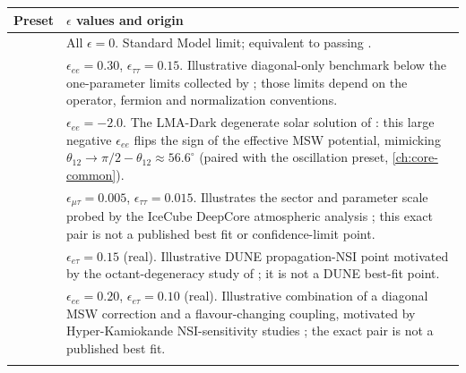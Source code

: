 \begin{implbox}
\begin{center}
\small
\begin{tabular}{@{}ll@{}}
\toprule
Preset & $\epsilon$ values and origin \\
\midrule
\parbox[t]{3.2cm}{} &
  \parbox[t]{9.4cm}{All $\epsilon=0$. Standard Model limit; equivalent to
  passing .} \\[10pt]
\parbox[t]{3.2cm}{} &
  \parbox[t]{9.4cm}{$\epsilon_{ee}=0.30$, $\epsilon_{\tau\tau}=0.15$.
  Illustrative diagonal-only benchmark below the one-parameter limits
  collected by \textcite{BiggioBlennowFM2009}; those limits depend on the
  operator, fermion and normalization conventions.} \\[18pt]
\parbox[t]{3.2cm}{} &
  \parbox[t]{9.4cm}{$\epsilon_{ee}=-2.0$. The LMA-Dark degenerate solar
  solution of \textcite{Esteban2018LMADark}: this large negative
  $\epsilon_{ee}$ flips the sign of the effective MSW potential, mimicking
  $\theta_{12}\to\pi/2-\theta_{12}\approx56.6^\circ$ (paired with the
   oscillation preset,
  \cref{ch:core-common}).} \\[24pt]
\parbox[t]{3.2cm}{} &
  \parbox[t]{9.4cm}{$\epsilon_{\mu\tau}=0.005$, $\epsilon_{\tau\tau}=0.015$.
  Illustrates the sector and parameter scale probed by the IceCube DeepCore
  atmospheric analysis \parencite{IceCube2022NSI}; this exact pair is not a
  published best fit or confidence-limit point.} \\[18pt]
\parbox[t]{3.2cm}{} &
  \parbox[t]{9.4cm}{$\epsilon_{e\tau}=0.15$ (real). Illustrative DUNE
  propagation-NSI point motivated by the octant-degeneracy study of
  \textcite{Agarwalla2016DUNENSI}; it is not a DUNE best-fit point.} \\[18pt]
\parbox[t]{3.2cm}{} &
  \parbox[t]{9.4cm}{$\epsilon_{ee}=0.20$, $\epsilon_{e\tau}=0.10$ (real).
  Illustrative combination of a diagonal MSW correction and a
  flavour-changing coupling, motivated by Hyper-Kamiokande NSI-sensitivity
  studies \parencite{Kelly2017HyperKNSI,Fukasawa2017HyperKNSI}; the exact
  pair is not a published best fit.} \\[18pt]
\parbox[t]{3.2cm}{} &

\end{tabular}
\end{center}
\end{implbox}
